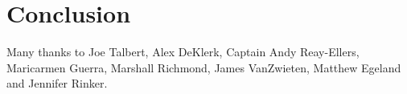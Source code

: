 \documentclass[twocol]{ametsoc}
\begin{document}
\section{Conclusion}





\acknowledgments

Many thanks to Joe Talbert, Alex DeKlerk, Captain Andy Reay-Ellers, Maricarmen Guerra, Marshall Richmond, James VanZwieten, Matthew Egeland and Jennifer Rinker.

\clearpage %


% 




\end{document}
